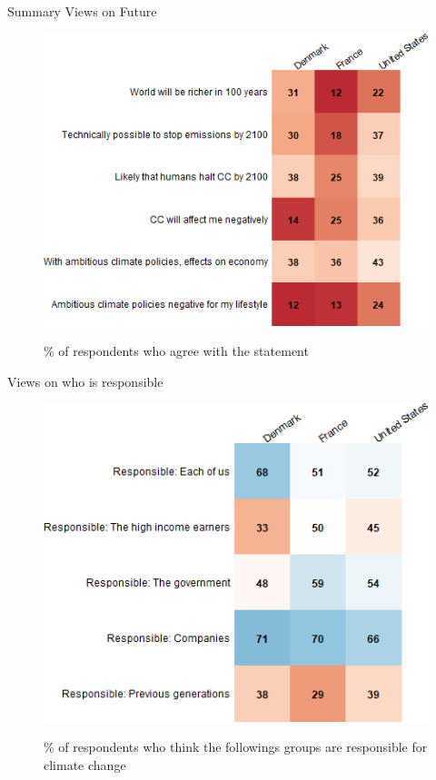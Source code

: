 \documentclass[aspectratio=169,9pt,dvipsnames]{beamer}
\begin{document}
\begin{frame}{Summary Views on Future}%
\begin{figure}[h!]
\centering
\caption{\% of respondents who agree with the statement}
\includegraphics[width=.59\textwidth]{../figures/country_comparison/future_positive_countries.png} \\
\end{figure}
\end{frame}

\begin{frame}{Views on who is responsible }%
\begin{figure}[h!]
\centering
\caption{\% of respondents who think the followings groups are responsible for climate change}
\includegraphics[width=.59\textwidth]{../figures/country_comparison/responsible_CC_positive_countries.png} \\
\end{figure}
\end{frame}
\end{document}
